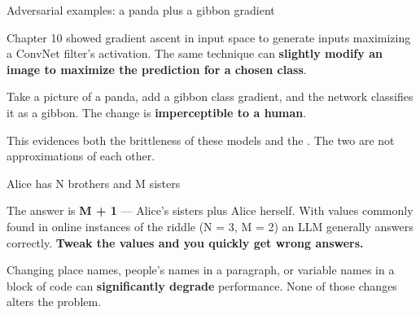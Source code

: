 \documentclass[aspectratio=169,11pt,t]{beamer}
\begin{document}
\begin{frame}[shrink=25]{Adversarial examples: a panda plus a gibbon gradient}
{\fontsize{9.4}{12.6}\selectfont\color{fg2}Chapter 10 showed gradient ascent in input space to generate inputs maximizing a ConvNet filter's activation. The same technique can \textbf{slightly modify an image to maximize the prediction for a chosen class}.\par}\vskip 4pt
{\fontsize{9.4}{12.6}\selectfont\color{fg2}Take a picture of a panda, add a gibbon class gradient, and the network classifies it as a gibbon. The change is \textbf{imperceptible to a human}.\par}\vskip 4pt
\begin{iband}[signal]
This evidences both the brittleness of these models and the . The two are not approximations of each other.
\end{iband}
\end{frame}

\begin{frame}[shrink=25]{Alice has N brothers and M sisters}
\begin{iquote}
\end{iquote}
{\fontsize{9.4}{12.6}\selectfont\color{fg2}The answer is \textbf{M + 1} --- Alice's sisters plus Alice herself. With values commonly found in online instances of the riddle (N = 3, M = 2) an LLM generally answers correctly. \textbf{Tweak the values and you quickly get wrong answers.}\par}\vskip 4pt
{\fontsize{9.4}{12.6}\selectfont\color{fg2}Changing place names, people's names in a paragraph, or variable names in a block of code can \textbf{significantly degrade} performance. None of those changes alters the problem.\par}\vskip 4pt
\end{frame}
\end{document}
